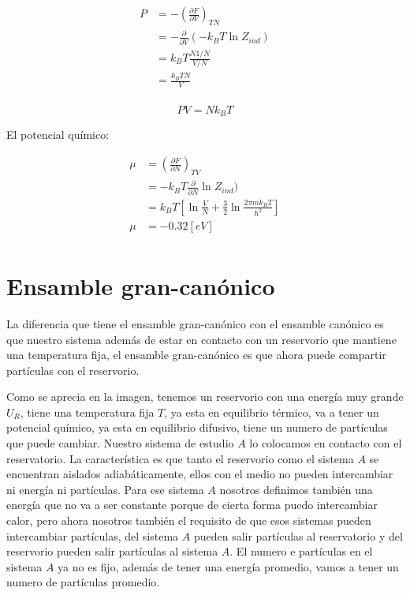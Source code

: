 \documentclass[11pt,fleqn]{book}
\begin{document}
\begin{equation}
    \begin{split}
    P&=-\left(\frac{\partial F}{\partial V}\right)_{TN}\\
    &= -\frac{\partial}{\partial V}(-k_{B}T\ln{Z_{ind}})\\
    &=k_{B}T\frac{N1/N}{V/N}\\
    &=\frac{k_{B}TN}{V}\\
    \end{split}
    \label{Eq. 4.86}
\end{equation}

\begin{equation*}
    PV=Nk_{B}T
\end{equation*}

El potencial químico:

\begin{equation}
    \begin{split}
    \mu&=\left(\frac{\partial F}{\partial N}\right)_{TV}\\
    &= -k_{B}T\frac{\partial}{\partial N}\ln{Z_{ind}})\\
    &=k_{B}T\left[\ln{\frac{V}{N}}+\frac{3}{2}\ln{\frac{2\pi mk_{B}T}{\hslash^{2}}}\right]\\
    \mu&=-0.32[eV]\\
    \end{split}
    \label{Eq. 4.87}
\end{equation}





\chapter{Ensamble gran-canónico}

La diferencia que tiene el ensamble gran-canónico con el ensamble canónico es que nuestro sistema además de estar en contacto con un reservorio que mantiene una temperatura fija, el ensamble gran-canónico es que ahora puede compartir partículas con el reservorio.



Como se aprecia en la imagen, tenemos un reservorio con una energía muy grande $U_{R}$, tiene una temperatura fija $T$, ya esta en equilibrio térmico, va a tener un potencial químico, ya esta en equilibrio difusivo, tiene un numero de partículas que puede cambiar. Nuestro sistema de estudio $A$ lo colocamos en contacto con el reservatorio. La característica es que tanto el reservorio como el sistema $A$ se encuentran aislados adiabáticamente, ellos con el medio no pueden intercambiar ni energía ni partículas. Para ese sistema $A$ nosotros definimos también una energía que no va a ser constante porque de cierta forma puedo intercambiar calor, pero ahora nosotros también el requisito de que esos sistemas pueden intercambiar partículas, del sistema $A$ pueden salir partículas al reservatorio y del reservorio pueden salir partículas al sistema $A$. El numero e partículas en el sistema $A$ ya no es fijo, además de tener una energía promedio, vamos a tener un numero de partículas promedio.\\
 
\end{document}
